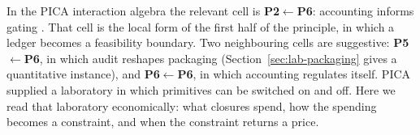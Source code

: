 In the PICA interaction algebra the relevant cell is \textbf{P2}\(\leftarrow\)\textbf{P6}: accounting informs gating \cite{tsiokos2026create}. That cell is the local form of the first half of the principle, in which a ledger becomes a feasibility boundary. Two neighbouring cells are suggestive: \textbf{P5}\(\leftarrow\)\textbf{P6}, in which audit reshapes packaging (Section~\ref{sec:lab-packaging} gives a quantitative instance), and \textbf{P6}\(\leftarrow\)\textbf{P6}, in which accounting regulates itself. PICA supplied a laboratory in which primitives can be switched on and off. Here we read that laboratory economically: what closures spend, how the spending becomes a constraint, and when the constraint returns a price.
